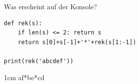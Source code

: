 \question[3]
Was erscheint auf der Konsole?
\begin{lstlisting}
def rek(s):
    if len(s) <= 2: return s
    return s[0]+s[-1]+'*'+rek(s[1:-1])

print(rek('abcdef'))
\end{lstlisting}
\begin{solutionbox}{1cm}
af*be*cd
\end{solutionbox}
